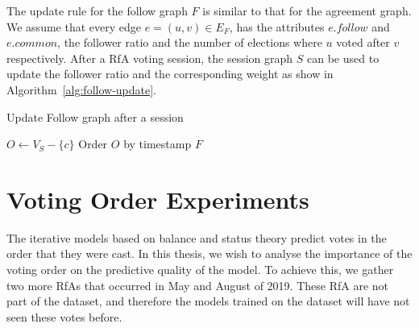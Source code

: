 The update rule for the follow graph $F$ is similar to that for the agreement graph.
We assume that every edge $e=(u,v) \in E_{F}$, has the attributes $e.follow$ and $e.common$, the follower ratio and the number of elections where $u$ voted after $v$ respectively.
After a RfA voting session, the session graph $S$ can be used to update the follower ratio and the corresponding weight as show in Algorithm~\ref{alg:follow-update}.

\begin{algorithm}[htp]
    \DontPrintSemicolon
    \caption{Update Follow graph after a session}
    \label{alg:follow-update}
    $O \leftarrow V_{S}-\{c\}$\;
    Order $O$ by timestamp\;
    \Return $F$
\end{algorithm}

\section{Voting Order Experiments}
\label{sec:voting-order}
The iterative models based on balance and status theory predict votes in the order that they were cast.
In this thesis, we wish to analyse the importance of the voting order on the predictive quality of the model.
To achieve this, we gather two more RfAs that occurred in May and August of 2019.
These RfA are not part of the \wikirfa dataset, and therefore the models trained on the dataset will have not seen these votes before.


